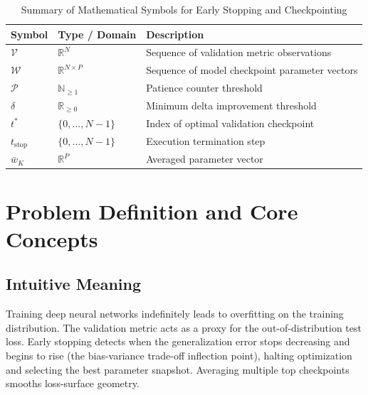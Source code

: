 \documentclass[11pt,a4paper]{article}
\theoremstyle{definition}
\begin{document}
\begin{table}[h]
\centering
\caption{Summary of Mathematical Symbols for Early Stopping and Checkpointing}
\begin{tabular}{lll}
\toprule
\textbf{Symbol} & \textbf{Type / Domain} & \textbf{Description} \\
\midrule
$\mathcal{V}$ & $\mathbb{R}^N$ & Sequence of validation metric observations \\
$\mathcal{W}$ & $\mathbb{R}^{N \times P}$ & Sequence of model checkpoint parameter vectors \\
$\mathcal{P}$ & $\mathbb{N}_{\ge 1}$ & Patience counter threshold \\
$\delta$ & $\mathbb{R}_{\ge 0}$ & Minimum delta improvement threshold \\
$t^*$ & $\{0, \dots, N-1\}$ & Index of optimal validation checkpoint \\
$t_{\text{stop}}$ & $\{0, \dots, N-1\}$ & Execution termination step \\
$\bar{w}_K$ & $\mathbb{R}^P$ & Averaged parameter vector \\
\bottomrule
\end{tabular}
\end{table}

\section{Problem Definition and Core Concepts}

\subsection{Intuitive Meaning}
Training deep neural networks indefinitely leads to overfitting on the training distribution. The validation metric acts as a proxy for the out-of-distribution test loss. Early stopping detects when the generalization error stops decreasing and begins to rise (the bias-variance trade-off inflection point), halting optimization and selecting the best parameter snapshot. Averaging multiple top checkpoints smooths loss-surface geometry.
\end{document}
